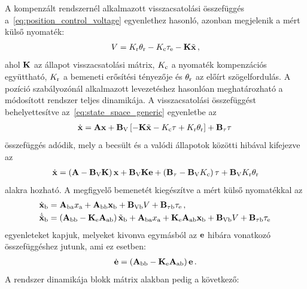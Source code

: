 A kompenzált rendszernél alkalmazott visszacsatolási összefüggés a~\eqref{eq:position_control_voltage} egyenlethez
hasonló, azonban megjelenik a mért külső nyomaték:
\begin{align}
    V = K_{\mathrm{r}} \theta_{\mathrm{r}} - K_{\mathrm{c}} \tau_{\mathrm{e}} - \mathbf{K} \tilde{\mathbf{x}}\,,
\end{align}
ahol $\mathbf{K}$ az állapot visszacsatolási mátrix, $K_{\mathrm{c}}$ a nyomaték kompenzációs együttható,
$K_{\mathrm{r}}$ a bemeneti erősítési tényezője és $\theta_{\mathrm{r}}$ az előírt szögelfordulás.
A pozíció szabályozónál alkalmazott levezetéshez hasonlóan meghatározható a módosított rendszer teljes dinamikája.
A visszacsatolási összefüggést behelyettesítve az~\eqref{eq:state_space_generic} egyenletbe az
\begin{align}\label{eq:state_control_law_subs}
    \dot{\mathbf{x}} = \mathbf{A} \mathbf{x} + \mathbf{B}_{\mathrm{V}}\left[-\mathbf{K} \tilde{\mathbf{x}} -K_{\mathrm{c}} \tau + K_{\mathrm{r}} \theta_{\mathrm{r}}\right] + \mathbf{B}_{\mathrm{\tau}} \tau\,
\end{align}
összefüggés adódik, mely a becsült és a valódi állapotok közötti hibával kifejezve az
\begin{align}
    \dot{\mathbf{x}} = \left(\mathbf{A} - \mathbf{B}_{\mathrm{V}} \mathbf{K}\right) \mathbf{x} + 
    \mathbf{B}_{\mathrm{V}} \mathbf{K} \mathbf{e} + 
    \left(\mathbf{B}_{\mathrm{\tau}} - \mathbf{B}_{\mathrm{V}} K_{\mathrm{c}}\right) \tau + 
    \mathbf{B}_{\mathrm{V}} K_{\mathrm{r}} \theta_{\mathrm{r}}
\end{align}
alakra hozható. 
A megfigyelő bemenetét kiegészítve a mért külső nyomatékkal az
\begin{equation}
    \begin{split}
    \dot{\mathbf{x}}_{\mathrm{b}} &= \mathbf{A}_{\mathrm{ba}} x_{\mathrm{a}} + \mathbf{A}_{\mathrm{bb}} \mathbf{x}_{\mathrm{b}} + 
    \mathbf{B}_{\mathrm{Vb}} V + \mathbf{B}_{\mathrm{\tau b}} \tau_{\mathrm{e}}\,,\\
    \dot{\tilde{\mathbf{x}}}_{\mathrm{b}} &= \left(\mathbf{A}_{\mathrm{bb}} - \mathbf{K}_{\mathrm{e}} \mathbf{A}_{\mathrm{ab}}\right) \tilde{\mathbf{x}}_{\mathrm{b}} +
    \mathbf{A}_{\mathrm{ba}} x_{\mathrm{a}} +
    \mathbf{K}_{\mathrm{e}} \mathbf{A}_{\mathrm{ab}} \mathbf{x}_{\mathrm{b}} +
    \mathbf{B}_{\mathrm{Vb}} V + \mathbf{B}_{\mathrm{\tau b}} \tau_{\mathrm{e}}\,
    \end{split}
\end{equation}
egyenleteket kapjuk, melyeket kivonva egymásból az \(\mathbf{e}\) hibára vonatkozó összefüggéshez jutunk, ami ez esetben:
\begin{align}
    \dot{\mathbf{e}} = \left(\mathbf{A}_{\mathrm{bb}} - \mathbf{K}_{\mathrm{e}} \mathbf{A}_{\mathrm{ab}}\right) \mathbf{e}\,.
\end{align}
A rendszer dinamikája blokk mátrix alakban pedig a következő:
